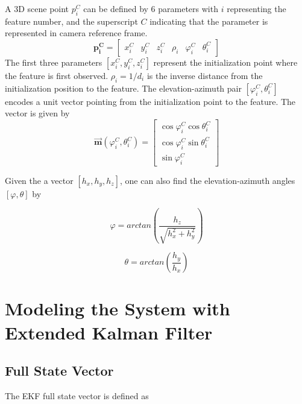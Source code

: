 \noindent A 3D scene point $p_{i}^{C}$ can be defined by 6 parameters
with $i$ representing the feature number, and the superscript $C$
indicating that the parameter is represented in camera reference frame.
\begin{equation}
\mathbf{p_{i}^{C}}=\begin{bmatrix}
x_{i}^{C} & y_{i}^{C} & z_{i}^{C} & \rho _{i} & \varphi _{i}^{C} & 
\theta _{i}^{C} 
\end{bmatrix}
\end{equation}
The first three parameters $[x_{i}^{C}, y_{i}^{C}, z_{i}^{C}]$
represent the initialization point where the feature is first observed.
$\rho_{i} = 1/d_i$ is the inverse distance from the initialization position
to the feature. The elevation-azimuth pair $[\varphi_{i}^{C},
\theta_{i}^{C}]$ encodes a unit vector pointing from the
initialization point to the feature. The vector is given by
\begin{equation}
\label{eq:m}
\vec{\mathbf{m}}(\varphi_{i}^{C}, \theta_{i}^{C})=\begin{bmatrix}
\cos\varphi_{i}^{C}\cos\theta _{i}^{C} \\
\cos\varphi_{i}^{C}\sin\theta _{i}^{C} \\
\sin\varphi_{i}^{C}
\end{bmatrix}
\end{equation}

\noindent Given the a vector $[h_x, h_y, h_z]$, one can also find the
elevation-azimuth angles $[\varphi, \theta]$ by

\begin{equation}
\label{eq:m_inv_varphi}
\varphi 
=arctan\left(\frac{h_{z}}{\sqrt{h_x^2+h_y^2}}\right)
\end{equation}

\begin{equation}
\label{eq:m_inv_theta}
\theta =arctan\left(\frac{h_{y}}{h_{x}}\right)
\end{equation}


\section{Modeling the System with Extended Kalman 
Filter}

\subsection{Full State Vector}

The EKF full state vector is defined as 

